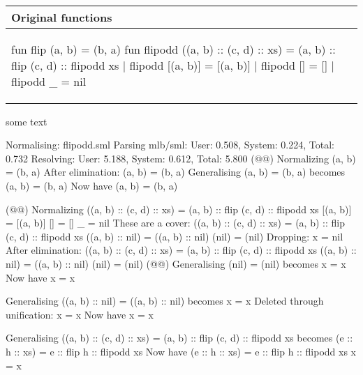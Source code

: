 \begin{example}[]\
  \label{ex:eval-normal-example-flipodd}\\
  
  \begin{center}
    \begin{tabular}{|l|}
      \hline
      \textbf{Original functions}
      \\\hline
      \begin{sml}
fun flip (a, b) = (b, a)
fun flipodd ((a, b) :: (c, d) :: xs) = (a, b) :: flip (c, d) 
                                              :: flipodd xs
  | flipodd [(a, b)] = [(a, b)]
  | flipodd [] = []
  | flipodd _ = nil        
      \end{sml}
      \\\hline
    \end{tabular}
  \end{center}
  
  some text
  
  \begin{narrow}{-3em}{0em}
    \setlength{\linewidth}{1.2\linewidth}
    \footnotesize
    
    \begin{multicols}{2}           
      \begin{sml}
Normalising: flipodd.sml
Parsing mlb/sml: 
  User: 0.508, System: 0.224, Total: 0.732
Resolving: 
  User: 5.188, System: 0.612, Total: 5.800
(@@)
Normalizing
  (a, b) = (b, a)
After elimination:
  (a, b) = (b, a)
Generalising
  (a, b) = (b, a)
becomes
  (a, b) = (b, a)
Now have
  (a, b) = (b, a)


(@@)
Normalizing
  ((a, b) :: (c, d) :: xs) = (a, b) :: flip (c, d) 
                                    :: flipodd xs
  [(a, b)] = [(a, b)]
  [] = []
  _ = nil
These are a cover:
  ((a, b) :: (c, d) :: xs) = (a, b) :: flip (c, d) 
                                    :: flipodd xs
  ((a, b) :: nil) = ((a, b) :: nil)
  (nil) = (nil)
Dropping:
  x = nil
After elimination:
  ((a, b) :: (c, d) :: xs) = (a, b) :: flip (c, d) 
                                    :: flipodd xs
  ((a, b) :: nil) = ((a, b) :: nil)
  (nil) = (nil)
(@@)
Generalising
  (nil) = (nil)
becomes
  x = x
Now have
  x = x

Generalising
  ((a, b) :: nil) = ((a, b) :: nil)
becomes
  x = x
Deleted through unification:
  x = x
Now have
  x = x

Generalising
  ((a, b) :: (c, d) :: xs) = (a, b) :: flip (c, d) 
                                    :: flipodd xs
becomes
  (e :: h :: xs) = e :: flip h :: flipodd xs
Now have
  (e :: h :: xs) = e :: flip h :: flipodd xs
  x = x


\end{sml}
\end{multicols}
\end{narrow}
\end{example}
